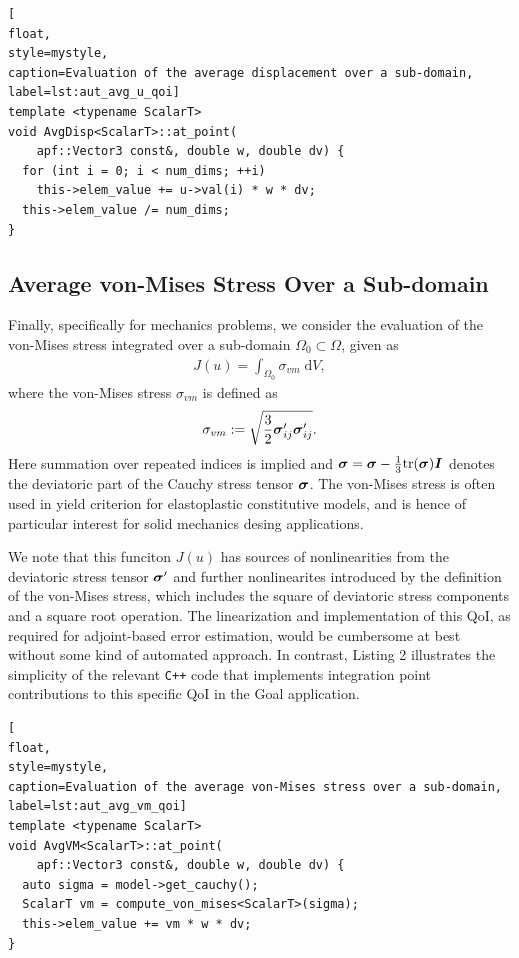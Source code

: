 \begin{lstlisting}[
float,
style=mystyle,
caption=Evaluation of the average displacement over a sub-domain,
label=lst:aut_avg_u_qoi]
template <typename ScalarT>
void AvgDisp<ScalarT>::at_point(
    apf::Vector3 const&, double w, double dv) {
  for (int i = 0; i < num_dims; ++i)
    this->elem_value += u->val(i) * w * dv;
  this->elem_value /= num_dims;
}
\end{lstlisting}

\subsection{Average von-Mises Stress Over a Sub-domain}

Finally, specifically for mechanics problems, we consider the evaluation of
the von-Mises stress integrated over a sub-domain $\Omega_0 \subset \Omega$,
given as
%
\begin{gather}
J(u) = \int_{\Omega_0} \sigma_{vm} \; \text{d} V,
\label{eq:aut_avg_vm_qoi}
\end{gather}
%
where the von-Mises stress $\sigma_{vm}$ is defined as
%
\begin{gather}
\sigma_{vm} := \sqrt{\frac32 \boldsymbol{\sigma}'_{ij} \boldsymbol{\sigma}'_{ij}}.
\label{eq:aut_vm_defn}
\end{gather}
%
Here summation over repeated indices is implied and
$\boldsymbol{\sigma} = \boldsymbol{\sigma} - \frac13 \text{tr}(\boldsymbol{\sigma})\boldsymbol{I}$ denotes
the deviatoric part of the Cauchy stress tensor $\boldsymbol{\sigma}$. The von-Mises
stress is often used in yield criterion for elastoplastic constitutive models,
and is hence of particular interest for solid mechanics desing applications.

We note that this funciton $J(u)$ has sources of nonlinearities from the
deviatoric stress tensor $\boldsymbol{\sigma}'$ and further nonlinearites introduced
by the definition of the von-Mises stress, which includes the square of
deviatoric stress components and a square root operation. The linearization
and implementation of this QoI, as required for adjoint-based error
estimation, would be cumbersome at best without some kind of automated
approach. In contrast, Listing 2 illustrates the simplicity of the relevant
\texttt{C++} code that implements integration point contributions to this
specific QoI in the Goal application.

\begin{lstlisting}[
float,
style=mystyle,
caption=Evaluation of the average von-Mises stress over a sub-domain,
label=lst:aut_avg_vm_qoi]
template <typename ScalarT>
void AvgVM<ScalarT>::at_point(
    apf::Vector3 const&, double w, double dv) {
  auto sigma = model->get_cauchy();
  ScalarT vm = compute_von_mises<ScalarT>(sigma);
  this->elem_value += vm * w * dv;
}
\end{lstlisting}

